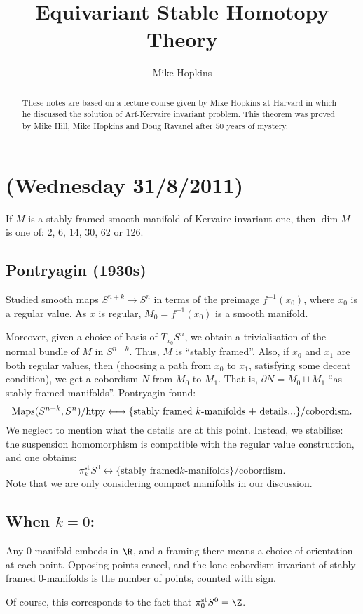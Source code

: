 \documentclass[11pt]{article}
\title{Equivariant Stable Homotopy Theory}
\author{Mike Hopkins}
\date{}
\newcommand{\NewLecture}[3]{\section{#1 {\small(#2/#3/2011)}}}
\begin{document}
\maketitle
\begin{abstract}
These notes are based on a lecture course given by Mike Hopkins at Harvard in
which he discussed the solution of Arf-Kervaire invariant problem. This theorem
was proved by Mike Hill, Mike Hopkins and Doug Ravanel after $50$ years of
mystery.
\end{abstract}
\NewLecture{}{Wednesday 31}{8}
\begin{thm*}
If $M$ is a stably framed smooth manifold of Kervaire invariant one, then $\dim
M$ is one of: 2, 6, 14, 30, 62 or 126.
\end{thm*}
\subsection*{Pontryagin (1930s)}
Studied smooth maps $S^{n+k}\to S^n$ in terms
of the preimage $f^{-1}(x_0)$, where $x_0$ is a regular value. As $x$ is
regular, $M_0=f^{-1}(x_0)$ is a smooth manifold.

Moreover, given a choice of basis of $T_{x_0}S^n$, we obtain a trivialisation of
the normal bundle of $M$ in $S^{n+k}$. Thus, $M$ is ``stably framed''. Also, if
$x_0$ and $x_1$ are both regular values, then (choosing a path from $x_0$ to
$x_1$, satisfying some decent condition), we get a cobordism $N$ from $M_0$ to
$M_1$. That is, $\partial N=M_0\sqcup M_1$ ``as stably framed manifolds''.
Pontryagin found:
\[\operatorname{Maps}(S^{n+k},S^n)/\text{htpy}\longleftrightarrow\{\text{stably framed
$k$-manifolds + details...}\}/\text{cobordism}.\]
We neglect to mention what the details are at this point. Instead, we stabilise:
the suspension homomorphism is compatible with the regular value construction,
and one obtains:
\[\pi_k^\text{st}S^0\longleftrightarrow\{\text{stably framed
$k$-manifolds}\}/\text{cobordism}.\]
Note that we are only considering compact manifolds in our discussion.
\subsection*{When \texorpdfstring{$k=0$}{k=0}:}
Any $0$-manifold embeds in $\R$, and a framing there means a choice of
orientation at each point. Opposing points cancel, and the lone cobordism
invariant of stably framed $0$-manifolds is the number of points, counted with
sign.

Of course, this corresponds to the fact that $\pi_0^\text{st}S^0=\Z$.
\end{document}
